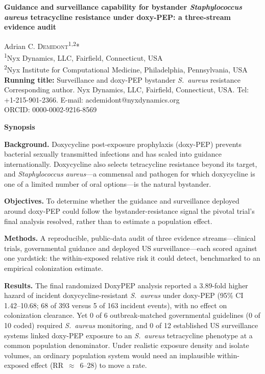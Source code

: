 \documentclass[12pt,a4paper]{article}
\newcommand{\sa}{\emph{S.~aureus}}
\newcommand{\Sa}{\emph{Staphylococcus aureus}}
\begin{document}
\begin{center}
{\Large\bfseries Guidance and surveillance capability for bystander \Sa{}
tetracycline resistance under doxy-PEP: a three-stream evidence audit}\\[1.2em]
\end{center}

\noindent Adrian C. \textsc{Demidont}\textsuperscript{1,2}*\\[0.6em]
\noindent\textsuperscript{1}Nyx Dynamics, LLC, Fairfield, Connecticut, USA\\
\noindent\textsuperscript{2}Nyx Institute for Computational Medicine, Philadelphia, Pennsylvania, USA\\[0.6em]

\noindent\textbf{Running title:} Surveillance and doxy-PEP bystander \sa{} resistance\\[0.6em]

\noindent*Corresponding author. Nyx Dynamics, LLC, Fairfield, Connecticut, USA.
Tel: +1-215-901-2366. E-mail: acdemidont@nyxdynamics.org\\
\noindent ORCID: 0000-0002-9216-8569

\vspace{1.5em}

\noindent\textbf{\large Synopsis}

\smallskip
\noindent\textbf{Background.} Doxycycline post-exposure prophylaxis (doxy-PEP)
prevents bacterial sexually transmitted infections and has scaled into guidance
internationally. Doxycycline also selects tetracycline resistance beyond its
target, and \Sa{}---a commensal and pathogen for which doxycycline is one of a
limited number of oral options---is the natural bystander.

\noindent\textbf{Objectives.} To determine whether the guidance and surveillance
deployed around doxy-PEP could follow the bystander-resistance signal the pivotal
trial's final analysis resolved, rather than to estimate a population effect.

\noindent\textbf{Methods.} A reproducible, public-data audit of three evidence
streams---clinical trials, governmental guidance and deployed US
surveillance---each scored against one yardstick: the within-exposed relative
risk it could detect, benchmarked to an empirical colonization estimate.

\noindent\textbf{Results.} The final randomized DoxyPEP analysis reported a
3.89-fold higher hazard of incident doxycycline-resistant \sa{} under doxy-PEP
(95\% CI 1.42--10.68; 68 of 393 versus 5 of 163 incident events), with no effect
on colonization clearance. Yet 0 of 6 outbreak-matched governmental guidelines (0 of 10 coded)
required \sa{} monitoring, and 0 of 12 established US surveillance systems linked
doxy-PEP exposure to an \sa{} tetracycline phenotype at a common population
denominator. Under realistic exposure density and isolate volumes, an ordinary
population system would need an implausible within-exposed effect
(RR~$\approx$~6--28) to move a rate.
\end{document}
